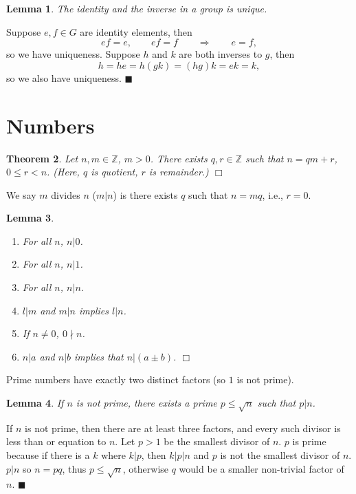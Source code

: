 \documentclass[letter-paper]{tufte-book}
\newtheorem{theorem}{\color{pastel-blue}Theorem}[section]
\newtheorem{lemma}[theorem]{\color{pastel-blue}Lemma}
\newenvironment{proof}[1][Proof]{\begin{trivlist}
\item[\hskip \labelsep {\bfseries #1}]}{\end{trivlist}}
\newcommand{\qed}{\hfill$\blacksquare$}
\newcommand{\qedwhite}{\hfill \ensuremath{\Box}}
\begin{document}
\begin{lemma}
	The identity and the inverse in a group is unique.
\end{lemma}
\begin{proof}
	Suppose $e,f\in G$ are identity elements, then
	\begin{equation*}
		ef=e,\qquad ef=f\qquad\Rightarrow\qquad e=f,
	\end{equation*}
	so we have uniqueness. Suppose $h$ and $k$ are both inverses to $g$, then
	\begin{equation*}
		h=he=h(gk)=(hg)k=ek=k,
	\end{equation*}
	so we also have uniqueness. \qed
\end{proof}


\section{Numbers}

\begin{theorem}
	Let $n,m\in\mathbb{Z}$, $m>0$. There exists $q,r\in\mathbb{Z}$ such that
	$n=qm+r$, $0\leq r<n$. (Here, $q$ is quotient, $r$ is remainder.) \qedwhite
\end{theorem}
We say $m$ divides $n$ ($m|n$) is there exists $q$ such that $n=mq$, i.e.,
$r=0$.
\begin{lemma}
	\begin{enumerate}
		\item For all $n$, $n|0$.
		\item For all $n$, $n|1$.
		\item For all $n$, $n|n$.
		\item $l|m$ and $m|n$ implies $l|n$.
		\item If $n\neq0$, $0\nmid n$.
		\item $n|a$ and $n|b$ implies that $n|(a\pm b)$. \qedwhite
	\end{enumerate}
\end{lemma}

Prime numbers have exactly two distinct factors (so $1$ is not prime).
\begin{lemma}
	If $n$ is not prime, there exists a prime $p\leq\sqrt{n}$ such that $p|n$.
\end{lemma}
\begin{proof}
	If $n$ is not prime, then there are at least three factors, and every such
	divisor is less than or equation to $n$. Let $p>1$ be the smallest divisor of
	$n$. $p$ is prime because if there is a $k$ where $k|p$, then $k|p|n$ and $p$
	is not the smallest divisor of $n$. $p|n$ so $n=pq$, thus $p\leq\sqrt{n}$,
	otherwise $q$ would be a smaller non-trivial factor of $n$. \qed
\end{proof}
\end{document}
